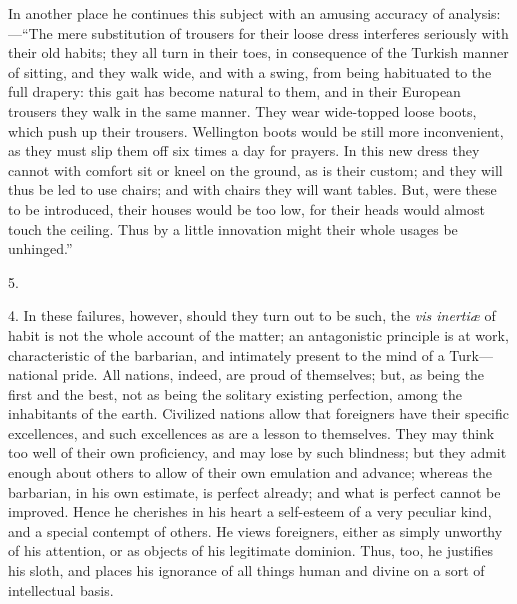 In another place he continues
this subject with an amusing accuracy of analysis:—``The mere
substitution of trousers for their loose dress interferes seriously
with their old habits; they all turn in their toes, in consequence of
the Turkish manner of sitting, and they walk wide, and with a swing,
from being habituated to the full drapery: this gait has become
natural to them, and in their European trousers they walk in the same
manner. They wear wide-topped loose boots, which push up their
trousers. Wellington boots would be still more inconvenient, as they
must slip them off six times a day for prayers. In this new dress they
cannot with comfort sit or kneel on the ground, as is their custom;
and they will thus be led to use chairs; and with chairs they will
want tables. But, were these to be introduced, their houses would be
too low, for their heads would almost touch the ceiling. Thus by a
little innovation might their whole usages be unhinged.''

5.

4. In these failures, however,
should they turn out to be such, the \emph{vis inertiæ} of habit is
not the whole account of the matter; an antagonistic principle is at
work, characteristic of the barbarian, and intimately present to the
mind of a Turk—national pride. All nations, indeed, are proud of
themselves; but, as being the first and the best, not as being the
solitary existing perfection, among the inhabitants of the earth.
Civilized nations allow that foreigners have their specific
excellences, and such excellences as are a lesson to themselves. They
may think too well of their own proficiency, and may lose by such
blindness; but they admit enough about others to allow of their own
emulation and advance; whereas the barbarian, in his own estimate, is
perfect already; and what is perfect cannot be improved. Hence he
cherishes in his heart a self-esteem of a very peculiar kind, and a
special contempt of others. He views foreigners, either as simply
unworthy of his attention, or as objects of his legitimate dominion.
Thus, too, he justifies his sloth, and places his ignorance of all
things human and divine on a sort of intellectual basis.

